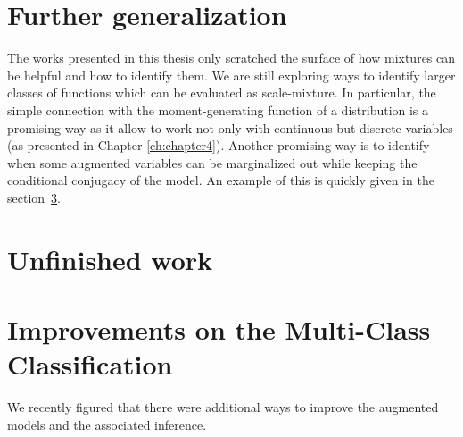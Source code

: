 

\graphicspath{{8/figures/}}


\section{Further generalization}
The works presented in this thesis only scratched the surface of how mixtures can be helpful and how to identify them.
We are still exploring ways to identify larger classes of functions which can be evaluated as scale-mixture.
In particular, the simple connection with the moment-generating function of a distribution is a promising way as it allow to work not only with continuous but discrete variables (as presented in Chapter \ref{ch:chapter4}).
Another promising way is to identify when some augmented variables can be marginalized out while keeping the conditional conjugacy of the model.
An example of this is quickly given in the section~\ref{sec:improve}.

\section{Unfinished work}

\section{Improvements on the Multi-Class Classification}
\label{sec:improve}
We recently figured that there were additional ways to improve the augmented models and the associated inference.



